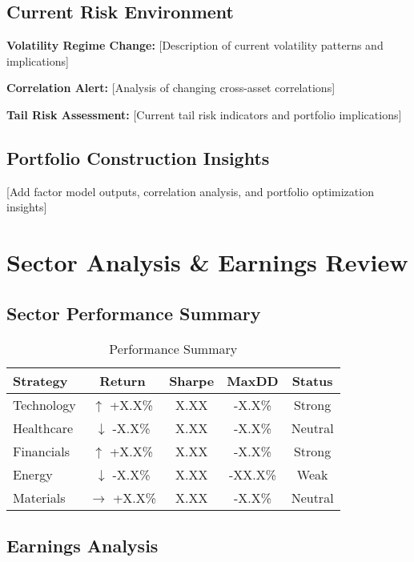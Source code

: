 \documentclass[11pt,a4paper]{article}
\makeatletter
\newcommand{\up}[1]{\textcolor{successgreen}{$\uparrow$ #1}}
\newcommand{\down}[1]{\textcolor{dangerred}{$\downarrow$ #1}}
\newcommand{\flat}[1]{\textcolor{mediumgray}{$\rightarrow$ #1}}
\newenvironment{perftable}[1][Performance Summary]{%
    \begin{table}[h]
    \centering
    \caption{#1}
    \footnotesize
    \renewcommand{\arraystretch}{1.3}
    \begin{tabular}{@{}lcccc@{}}
    \toprule
    \rowcolor{jetblack!10}
    \textbf{Strategy} & \textbf{Return} & \textbf{Sharpe} & \textbf{MaxDD} & \textbf{Status} \\
    \midrule
}{%
    \bottomrule
    \end{tabular}
    \end{table}
}
\makeatother
\begin{document}
\subsection{Current Risk Environment}

\begin{riskbox}
\textbf{Volatility Regime Change:} [Description of current volatility patterns and implications]

\textbf{Correlation Alert:} [Analysis of changing cross-asset correlations]

\textbf{Tail Risk Assessment:} [Current tail risk indicators and portfolio implications]
\end{riskbox}

\subsection{Portfolio Construction Insights}

[Add factor model outputs, correlation analysis, and portfolio optimization insights]

\section{Sector Analysis \& Earnings Review}

\subsection{Sector Performance Summary}

\begin{perftable}
Technology & \up{+X.X\%} & X.XX & -X.X\% & \textcolor{successgreen}{Strong} \\
\rowcolor{tablealternate}
Healthcare & \down{-X.X\%} & X.XX & -X.X\% & \textcolor{warningorange}{Neutral} \\
Financials & \up{+X.X\%} & X.XX & -X.X\% & \textcolor{successgreen}{Strong} \\
\rowcolor{tablealternate}
Energy & \down{-X.X\%} & X.XX & -XX.X\% & \textcolor{dangerred}{Weak} \\
Materials & \flat{+X.X\%} & X.XX & -X.X\% & \textcolor{warningorange}{Neutral} \\
\end{perftable}

\subsection{Earnings Analysis}
\end{document}

